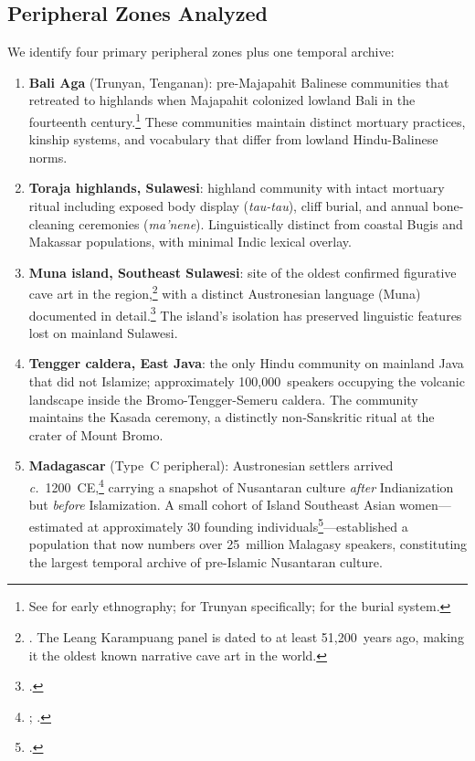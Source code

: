 \documentclass[12pt,a4paper]{article}
\begin{document}
\subsection{Peripheral Zones Analyzed}

We identify four primary peripheral zones plus one temporal archive:

\begin{enumerate}
\item \textbf{Bali Aga} (Trunyan, Tenganan): pre-Majapahit Balinese communities that retreated to highlands when Majapahit colonized lowland Bali in the fourteenth century.\footnote{See \autocite{covarrubias1937bali} for early ethnography; \autocite{danandjaja1980kebudayaan} for Trunyan specifically; \autocite{astiti2005trunyan} for the burial system.} These communities maintain distinct mortuary practices, kinship systems, and vocabulary that differ from lowland Hindu-Balinese norms.

\item \textbf{Toraja highlands, Sulawesi}: highland community with intact mortuary ritual including exposed body display (\emph{tau-tau}), cliff burial, and annual bone-cleaning ceremonies (\emph{ma'nene}). Linguistically distinct from coastal Bugis and Makassar populations, with minimal Indic lexical overlay.

\item \textbf{Muna island, Southeast Sulawesi}: site of the oldest confirmed figurative cave art in the region,\footnote{\autocite{oktaviana2024cave}. The Leang Karampuang panel is dated to at least 51,200~years ago, making it the oldest known narrative cave art in the world.} with a distinct Austronesian language (Muna) documented in detail.\footnote{\autocite{vandenberg1996muna}.} The island's isolation has preserved linguistic features lost on mainland Sulawesi.

\item \textbf{Tengger caldera, East Java}: the only Hindu community on mainland Java that did not Islamize; approximately 100,000~speakers occupying the volcanic landscape inside the Bromo-Tengger-Semeru caldera. The community maintains the Kasada ceremony, a distinctly non-Sanskritic ritual at the crater of Mount Bromo.

\item \textbf{Madagascar} (Type~C peripheral): Austronesian settlers arrived \textit{c.}~1200~CE,\footnote{\autocite{cox2012small}; \autocite{beaujard2011first}.} carrying a snapshot of Nusantaran culture \emph{after} Indianization but \emph{before} Islamization. A small cohort of Island Southeast Asian women---estimated at approximately 30 founding individuals\footnote{\autocite{cox2012small}.}---established a population that now numbers over 25~million Malagasy speakers, constituting the largest temporal archive of pre-Islamic Nusantaran culture.
\end{enumerate}
\end{document}
